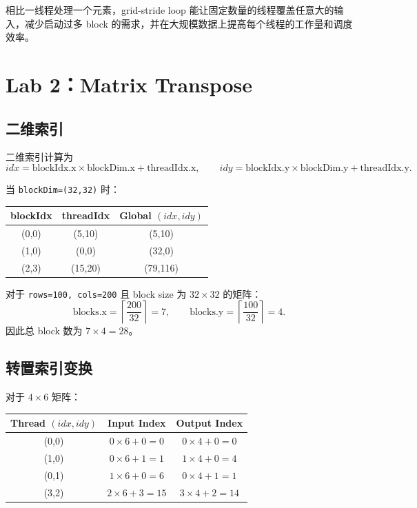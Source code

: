 \documentclass[UTF8,a4paper,12pt,fontset=none]{ctexart}
\begin{document}
相比一线程处理一个元素，grid-stride loop 能让固定数量的线程覆盖任意大的输入，减少启动过多 block 的需求，并在大规模数据上提高每个线程的工作量和调度效率。

\section{Lab 2：Matrix Transpose}

\subsection{二维索引}

二维索引计算为
\[
  idx=\text{blockIdx.x}\times \text{blockDim.x}+\text{threadIdx.x},
  \qquad
  idy=\text{blockIdx.y}\times \text{blockDim.y}+\text{threadIdx.y}.
\]

当 \texttt{blockDim=(32,32)} 时：

\begin{center}
\begin{tabular}{ccc}
\toprule
blockIdx & threadIdx & Global $(idx,idy)$ \\
\midrule
(0,0) & (5,10)  & (5,10) \\
(1,0) & (0,0)   & (32,0) \\
(2,3) & (15,20) & (79,116) \\
\bottomrule
\end{tabular}
\end{center}

对于 \texttt{rows=100, cols=200} 且 block size 为 $32\times32$ 的矩阵：
\[
  \text{blocks.x}=\left\lceil\frac{200}{32}\right\rceil=7,
  \qquad
  \text{blocks.y}=\left\lceil\frac{100}{32}\right\rceil=4.
\]
因此总 block 数为 $7\times4=28$。

\subsection{转置索引变换}

对于 $4\times6$ 矩阵：

\begin{center}
\begin{tabular}{ccc}
\toprule
Thread $(idx,idy)$ & Input Index & Output Index \\
\midrule
(0,0) & $0\times6+0=0$ & $0\times4+0=0$ \\
(1,0) & $0\times6+1=1$ & $1\times4+0=4$ \\
(0,1) & $1\times6+0=6$ & $0\times4+1=1$ \\
(3,2) & $2\times6+3=15$ & $3\times4+2=14$ \\
\bottomrule
\end{tabular}
\end{center}
\end{document}
